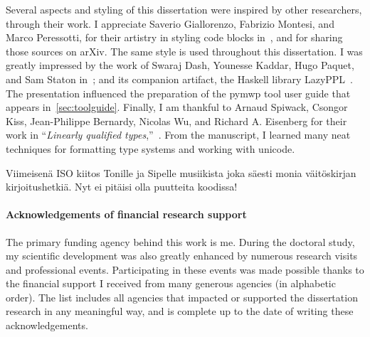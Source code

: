 Several aspects and styling of this dissertation were inspired by other researchers, through their work.
I appreciate Saverio Giallorenzo, Fabrizio Montesi, and Marco Peressotti, for their artistry in styling code blocks in~\cite{giallorenzo2024}, and for sharing those sources on arXiv.
The same style is used throughout this dissertation.
I was greatly impressed by the work of Swaraj Dash, Younesse Kaddar, Hugo Paquet, and Sam Staton in~\cite{dash2023};
and its companion artifact, the Haskell library LazyPPL~\cite{dash2023b}.
The presentation influenced the preparation of the pymwp tool user guide that appears in~\autoref{sec:toolguide}.
Finally, I am thankful to Arnaud Spiwack, Csongor Kiss, Jean-Philippe Bernardy, Nicolas Wu, and Richard A. Eisenberg
for their work in \enquote{\textit{Linearly qualified types},}~\cite{spiwack2022}.
From the manuscript, I learned many neat techniques for formatting type systems and working with unicode.

Viimeisenä ISO kiitos Tonille ja Sipelle musiikista joka säesti monia väitöskirjan kirjoitushetkiä.
Nyt ei pitäisi olla puutteita koodissa!

\paragraph*{Acknowledgements of financial research support}
The primary funding agency behind this work is me.
During the doctoral study, my scientific development was also greatly enhanced by numerous research visits and professional events.
Participating in these events was made possible thanks to the financial support I received from many generous agencies (in alphabetic order).
The list includes all agencies that impacted or supported the dissertation research in any meaningful way, and is complete up to the date of writing these acknowledgements.

